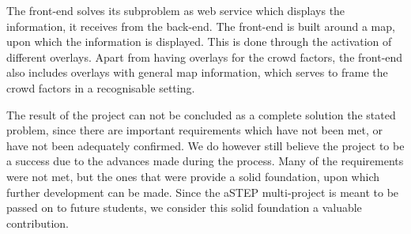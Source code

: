 
The front-end solves its subproblem as web service which displays the information, it receives from the back-end. The front-end is built around a map, upon which the information is displayed. This is done through the activation of different overlays. Apart from having overlays for the crowd factors, the front-end also includes overlays with general map information, which serves to frame the crowd factors in a recognisable setting.

The result of the project can not be concluded as a complete solution the stated problem, since there are important requirements which have not been met, or have not been adequately confirmed. We do however still believe the project to be a success due to the advances made during the process. Many of the requirements were not met, but the ones that were provide a solid foundation, upon which further development can be made. Since the aSTEP multi-project is meant to be passed on to future students, we consider this solid foundation a valuable contribution.
 
 




